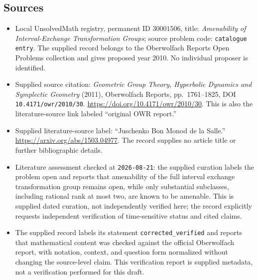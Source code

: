 \documentclass[11pt]{article}
\begin{document}
\subsection{Sources}
\begin{itemize}
\item Local UnsolvedMath registry, permanent ID \(30001506\), title: \emph{Amenability of Interval-Exchange Transformation Groups}; source problem code: \texttt{catalogue entry}. The supplied record belongs to the Oberwolfach Reports Open Problems collection and gives proposed year 2010. No individual proposer is identified.
\item Supplied source citation: \emph{Geometric Group Theory, Hyperbolic Dynamics and Symplectic Geometry} (2011), Oberwolfach Reports, pp.\ 1761--1825, DOI \texttt{10.4171/owr/2010/30}. \url{https://doi.org/10.4171/owr/2010/30}. This is also the literature-source link labeled ``original OWR report.''
\item Supplied literature-source label: ``Juschenko Bon Monod de la Salle.'' \url{https://arxiv.org/abs/1503.04977}. The record supplies no article title or further bibliographic details.
\item Literature assessment checked at \texttt{2026-08-21}: the supplied curation labels the problem open and reports that amenability of the full interval exchange transformation group remains open, while only substantial subclasses, including rational rank at most two, are known to be amenable. This is supplied dated curation, not independently verified here; the record explicitly requests independent verification of time-sensitive status and cited claims.
\item The supplied record labels its statement \texttt{corrected\_verified} and reports that mathematical content was checked against the official Oberwolfach report, with notation, context, and question form normalized without changing the source-level claim. This verification report is supplied metadata, not a verification performed for this draft.
\end{itemize}
\end{document}
